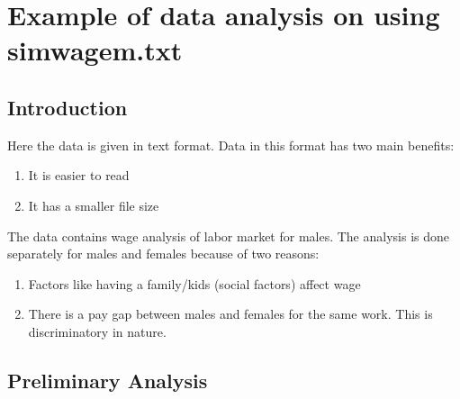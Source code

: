 \documentclass[notoc]{tufte-book}
\begin{document}
\chapter{Example of data analysis on  using simwagem.txt}
\section{Introduction}
    Here the data is given in text format. Data in this format has two main benefits:
    \begin{enumerate}
        \item It is easier to read
        \item It has a smaller file size
    \end{enumerate}
    The data contains wage analysis of labor market for males. The analysis
    is done separately for males and females because of two reasons:
    \begin{enumerate}
        \item Factors like having a family/kids (social factors) affect wage
        \item There is a pay gap between males and females for the same work. This is discriminatory in nature. 
    \end{enumerate}
\section{Preliminary Analysis}
\end{document}
